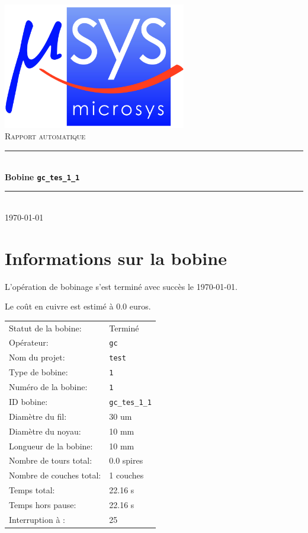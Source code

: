 \documentclass[a4paper, 11pt]{article}
\begin{document}
\begin{titlepage}
\begin{center}
\includegraphics[width=0.6\textwidth]{./sources/microsys.jpg}~ \\[5cm]
\textsc{\LARGE Rapport automatique}\\[1.5cm]
\rule{\linewidth}{0.5mm} \\[0.4cm]
{ \huge \bfseries Bobine \verb?gc_tes_1_1? \\[0.4cm] }
\rule{\linewidth}{0.5mm} \\[3.5cm]
\textsc{\large \today}\\[0.5cm]
\vfill
\end{center}
\end{titlepage}
\fancyhf{}
\lfoot{\fancyplain{}{\rightmark}}
\rfoot{\fancyplain{}{\thepage}}
\section{Informations sur la bobine}
L'opération de bobinage s'est terminé avec succès le \today.
 
Le coût en cuivre est estimé à 0.0 euros.
 
 
\begin{tabular}{ll}
Statut de la bobine: & Terminé \\ 
Opérateur: & \verb?gc? \\ 
Nom du projet: & \verb?test? \\ 
Type de bobine: & \verb?1? \\ 
Numéro de la bobine: & \verb?1? \\ 
ID bobine: & \verb?gc_tes_1_1? \\ 
Diamètre du fil: & 30 um \\ 
Diamètre du noyau: & 10 mm \\ 
Longueur de la bobine: & 10 mm \\ 
Nombre de tours total: & 0.0 spires \\ 
Nombre de couches total: & 1 couches \\ 
Temps total: & 22.16 s \\ 
Temps hors pause: & 22.16 s \\ 
Interruption à : & 25 \\ 
\end{tabular}
\clearpage
\end{document}
